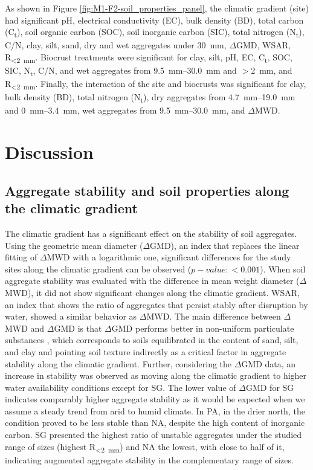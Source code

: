 \FloatBarrier

As shown in Figure \ref{fig:M1-F2-soil_properties_panel}, the climatic gradient (site) had significant pH, electrical conductivity (EC), bulk density (BD), total carbon (C\textsubscript{t}), soil organic carbon (SOC), soil inorganic carbon (SIC), total nitrogen (N\textsubscript{t}), C/N, clay, silt, sand, dry and wet aggregates under \SI{30}{\milli\meter}, $\Delta$GMD, WSAR, R\textsubscript{<\SI{2}{\milli\meter}}. Biocrust treatments were significant for clay, silt, pH, EC, C\textsubscript{t}, SOC, SIC, N\textsubscript{t}, C/N, and wet aggregates from \SIrange{9.5}{30.0}{\milli\meter} and $>$\SI{2}{\milli\meter}, and R\textsubscript{<\SI{2}{\milli\meter}}. Finally, the interaction of the site and biocrusts was significant for clay, bulk density (BD), total nitrogen (N\textsubscript{t}), dry aggregates from \SIrange{4.7}{19.0}{\milli\meter} and \SIrange{0}{3.4}{\milli\meter}, wet aggregates from \SIrange{9.5}{30.0}{\milli\meter}, and $\Delta$MWD.

\section{Discussion}

\subsection{Aggregate stability and soil properties along the climatic gradient}

The climatic gradient has a significant effect on the stability of soil aggregates. Using the geometric mean diameter ($\Delta$GMD), an index that replaces the linear fitting of $\Delta$MWD with a logarithmic one, significant differences for the study sites along the climatic gradient can be observed ($p-value: <0.001$). When soil aggregate stability was evaluated with the difference in mean weight diameter ($\Delta$MWD), it did not show significant changes along the climatic gradient. WSAR, an index that shows the ratio of aggregates that persist stably after disruption by water, showed a similar behavior as $\Delta$MWD. The main difference between $\Delta$MWD and $\Delta$GMD is that $\Delta$GMD performs better in non-uniform particulate substances \citep{Hatch1929,Gardner1956}, which corresponds to soils equilibrated in the content of sand, silt, and clay \citep{Mazurak1950} and pointing soil texture indirectly as a critical factor in aggregate stability along the climatic gradient. Further, considering the $\Delta$GMD data, an increase in stability was observed as moving along the climatic gradient to higher water availability conditions except for SG. The lower value of $\Delta$GMD for SG indicates comparably higher aggregate stability as it would be expected when we assume a steady trend from arid to humid climate. In PA, in the drier north, the condition proved to be less stable than NA, despite the high content of inorganic carbon. SG presented the highest ratio of unstable aggregates under the studied range of sizes (highest R\textsubscript{<\SI{2}{\milli\meter}}) and NA the lowest, with close to half of it, indicating augmented aggregate stability in the complementary range of sizes.

